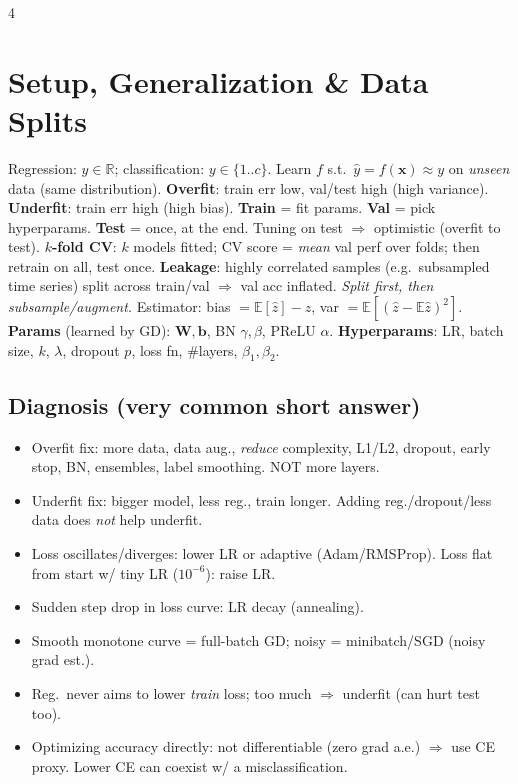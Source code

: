 \documentclass[8pt,landscape]{extarticle}
\newcommand{\x}{\mathbf{x}}
\newcommand{\bb}{\mathbf{b}}
\newcommand{\W}{\mathbf{W}}
\newcommand{\E}{\mathbb{E}}
\newcommand{\R}{\mathbb{R}}
\begin{document}
\fontsize{8.5}{9.7}\selectfont\raggedright
\raggedcolumns
\begin{multicols*}{4}

\section{Setup, Generalization \& Data Splits}
Regression: $y\in\R$; classification: $y\in\{1..c\}$. Learn $f$ s.t.\ $\hat y=f(\x)\approx y$ on \emph{unseen} data (same distribution).
\textbf{Overfit}: train err low, val/test high (high variance). \textbf{Underfit}: train err high (high bias).
\textbf{Train} = fit params. \textbf{Val} = pick hyperparams. \textbf{Test} = once, at the end. Tuning on test $\Rightarrow$ optimistic (overfit to test).
\textbf{$k$-fold CV}: $k$ models fitted; CV score = \emph{mean} val perf over folds; then retrain on all, test once.
\textbf{Leakage}: highly correlated samples (e.g.\ subsampled time series) split across train/val $\Rightarrow$ val acc inflated. \emph{Split first, then subsample/augment.}
Estimator: bias $=\E[\hat z]-z$, var $=\E[(\hat z-\E\hat z)^2]$.
\textbf{Params} (learned by GD): $\W,\bb$, BN $\gamma,\beta$, PReLU $\alpha$. \textbf{Hyperparams}: LR, batch size, $k$, $\lambda$, dropout $p$, loss fn, \#layers, $\beta_1,\beta_2$.

\subsection{Diagnosis (very common short answer)}
\begin{itemize}
\item Overfit fix: more data, data aug., \emph{reduce} complexity, L1/L2, dropout, early stop, BN, ensembles, label smoothing. NOT more layers.
\item Underfit fix: bigger model, less reg., train longer. Adding reg./dropout/less data does \emph{not} help underfit.
\item Loss oscillates/diverges: lower LR or adaptive (Adam/RMSProp). Loss flat from start w/ tiny LR ($10^{-6}$): raise LR.
\item Sudden step drop in loss curve: LR decay (annealing).
\item Smooth monotone curve = full-batch GD; noisy = minibatch/SGD (noisy grad est.).
\item Reg.\ never aims to lower \emph{train} loss; too much $\Rightarrow$ underfit (can hurt test too).
\item Optimizing accuracy directly: not differentiable (zero grad a.e.) $\Rightarrow$ use CE proxy. Lower CE can coexist w/ a misclassification.
\end{itemize}


\end{multicols*}
\end{document}
